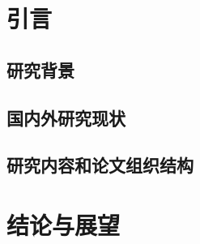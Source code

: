 \documentclass[master,xetex]{thuthesis}
\begin{document}
\graphicspath{{figures/}}


\frontmatter


\tableofcontents

%

\mainmatter
\chapter{引言}
\section{研究背景}
\section{国内外研究现状}
\section{研究内容和论文组织结构}









\chapter{结论与展望}


\backmatter







%
\end{document}
